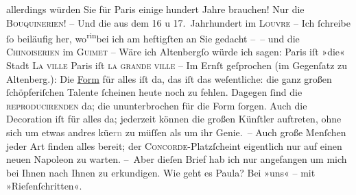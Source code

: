 \begin{ledgroupsized}[t]{13cm}
           allerdings würden Sie für Paris einige hundert
               Jahre brauchen!\pend
           \pstart
           Nur die \textsc{Bouquinerien}! – Und die \label{K_L00670-1v}\label{K_L00670-1h} aus
               dem 16 u 17. Jahrhundert im \textsc{Louvre} – \pend
           \pstart
           Ich ſchreibe ſo beiläufig her, wo\substVorne{}\textsuperscript{rin}\substDazwischen{}bei\substHinten{} ich am heftigſten an Sie gedacht – {\pb}– und die
                  \textsc{Chinoiserien} im \textsc{Guimet} –\pend
           \pstart
           Wäre ich Altenbergſo würde ich sagen:\pend
           \pstart
           Paris iſt »die« Stadt {\dotsfive}{ }\textsc{La ville}{ }{\dotsseven}\pend
           \pstart
           Paris iſt \textsc{la grande
                  ville}{ }{\dotsfour}\pend
           \pstart
           \numberlinefalse{}–\numberlinetrue{}\pend
           \pstart
           Im Ernſt geſprochen (im Gegenſatz zu Altenberg.): Die \uline{Form} für alles iſt da, \introOben{}das iſt\introOben{} das weſentliche: die ganz {\pb}großen \introOben{}ſchöpferiſchen\introOben{} Talente
               ſcheinen heute noch zu fehlen. Dagegen ſind die \textsc{reproducirenden} da; die ununterbrochen für die Form ſorgen. Auch die
               Decoration iſt für alles da; jederzeit können die großen Künſtler auftreten, ohne
               sich um etwas andres kü{\geminationm}e\textcolor{gray}{rn} zu müſſen
               als um ihr Genie. – Auch große Menſchen {\pb}jeder Art
               finden alles bereit; der \textsc{Concorde}-Platzſcheint eigentlich nur auf einen neuen Napoleon zu warten.\pend
           \pstart
           – Aber dieſen Brief hab ich nur angefangen um mich bei Ihnen nach Ihnen zu
               erkundigen. Wie geht es Paula? Bei »uns« – mit »Rieſen{\pb}ſchritten«.\pend

\end{ledgroupsized}
